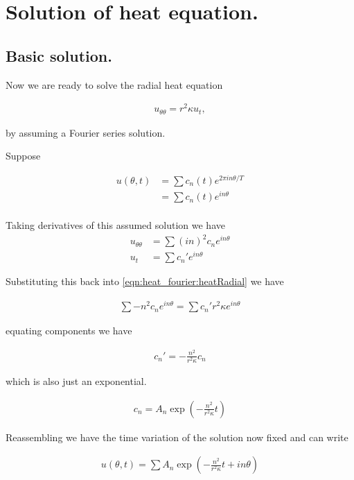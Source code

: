 \section{Solution of heat equation. } 

\subsection{Basic solution. }

Now we are ready to solve the radial heat equation

\begin{align}\label{eqn:heat_fourier:heatRadial}
u_{\theta\theta} = r^2 \kappa u_t,
\end{align}

by assuming a Fourier series solution.

Suppose

\begin{align*}
u(\theta, t) 
&= \sum c_n(t) e^{2 \pi i n \theta / T} \\
&= \sum c_n(t) e^{i n \theta} \\
\end{align*}

Taking derivatives of this assumed solution we have
\begin{align*}
u_{\theta\theta} &= \sum (i n)^2 c_n e^{i n \theta} \\
u_{t} &= \sum c_n' e^{i n \theta}
\end{align*}

Substituting this back into \ref{eqn:heat_fourier:heatRadial} we have

\begin{align*}
\sum - n^2 c_n e^{ i n \theta} = \sum c_n' r^2 \kappa e^{i n \theta}
\end{align*}

equating components we have 

\begin{align*}
c_n' = - \frac{n^2}{ r^2 \kappa } c_n 
\end{align*}

which is also just an exponential.

\begin{align*}
c_n = A_n \exp\left(- \frac{n^2}{ r^2 \kappa } t \right)
\end{align*}

Reassembling we have the time variation of the solution now fixed and can write

\begin{align}
u(\theta, t) = \sum A_n \exp\left(- \frac{n^2}{ r^2 \kappa } t + i n \theta\right)
\end{align}

